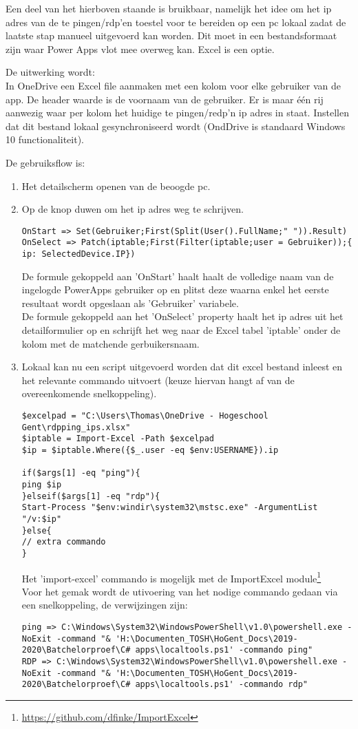 Een deel van het hierboven staande is bruikbaar, namelijk het idee om het ip adres van de te pingen/rdp'en toestel voor te bereiden op een pc lokaal zadat de laatste stap manueel uitgevoerd kan worden. Dit moet in een bestandsformaat zijn waar Power Apps vlot mee overweg kan. Excel is een optie.

De uitwerking wordt:\\
In OneDrive een Excel file aanmaken met een kolom voor elke gebruiker van de app. De header waarde is  de voornaam van de gebruiker. Er is maar één rij aanwezig waar per kolom het huidige te pingen/redp'n ip adres in staat. Instellen dat dit bestand lokaal gesynchroniseerd wordt (OndDrive is standaard Windows 10 functionaliteit).

De gebruiksflow is:
\begin{enumerate}
    \item Het detailscherm openen van de beoogde pc.
    \item Op de knop duwen om het ip adres weg te schrijven.
\begin{lstlisting}
OnStart => Set(Gebruiker;First(Split(User().FullName;" ")).Result)
OnSelect => Patch(iptable;First(Filter(iptable;user = Gebruiker));{ ip: SelectedDevice.IP})
\end{lstlisting}
    De formule gekoppeld aan 'OnStart' haalt haalt de volledige naam van de ingelogde PowerApps gebruiker op en plitst deze waarna enkel het eerste resultaat wordt opgeslaan als 'Gebruiker' variabele.\\
    De formule gekoppeld aan het 'OnSelect' property haalt het ip adres uit het detailformulier op en schrijft het weg naar de Excel tabel 'iptable' onder de kolom met de matchende gerbuikersnaam.
    \item Lokaal kan nu een script uitgevoerd worden dat dit excel bestand inleest en het relevante commando uitvoert (keuze hiervan hangt af van de overeenkomende snelkoppeling).
\begin{lstlisting}[style=powershellStyle]
$excelpad = "C:\Users\Thomas\OneDrive - Hogeschool Gent\rdpping_ips.xlsx"
$iptable = Import-Excel -Path $excelpad
$ip = $iptable.Where({$_.user -eq $env:USERNAME}).ip

if($args[1] -eq "ping"){
ping $ip
}elseif($args[1] -eq "rdp"){
Start-Process "$env:windir\system32\mstsc.exe" -ArgumentList "/v:$ip"
}else{
// extra commando
}
\end{lstlisting}
    Het 'import-excel' commando is mogelijk met de ImportExcel module\footnote{\url{https://github.com/dfinke/ImportExcel}}\\
    Voor het gemak wordt de utivoering van het nodige commando gedaan via een snelkoppeling, de verwijzingen zijn:
\begin{lstlisting}
ping => C:\Windows\System32\WindowsPowerShell\v1.0\powershell.exe -NoExit -command "& 'H:\Documenten_TOSH\HoGent_Docs\2019-2020\Batchelorproef\C# apps\localtools.ps1' -commando ping"
RDP => C:\Windows\System32\WindowsPowerShell\v1.0\powershell.exe -NoExit -command "& 'H:\Documenten_TOSH\HoGent_Docs\2019-2020\Batchelorproef\C# apps\localtools.ps1' -commando rdp"
\end{lstlisting}
\end{enumerate}

